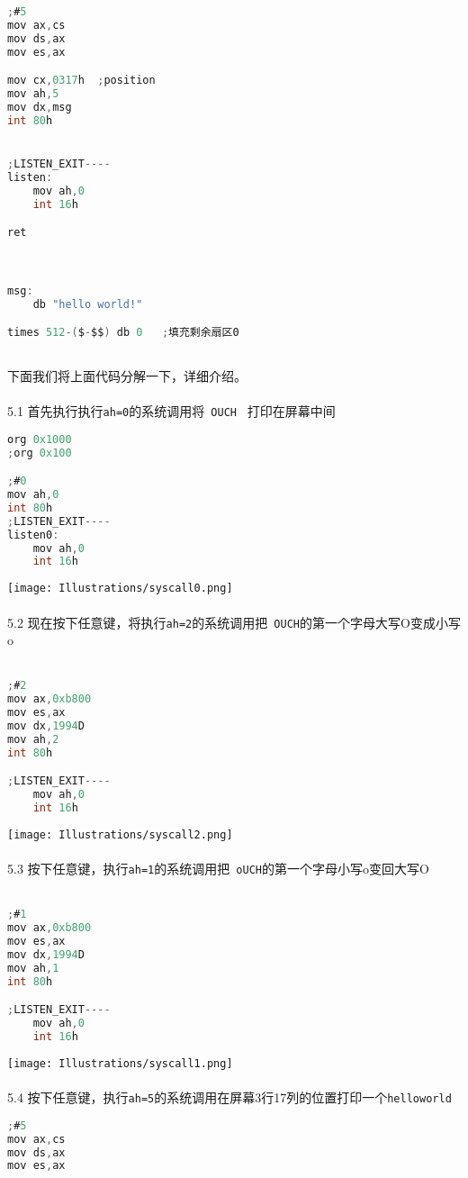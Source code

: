 \documentclass[a4paper]{article}
\begin{document}
{{{\begin{lstlisting}[language={C}]
;#5
mov ax,cs
mov ds,ax
mov es,ax

mov cx,0317h  ;position
mov ah,5
mov dx,msg
int 80h


;LISTEN_EXIT----
listen:
	mov ah,0
	int 16h

ret



msg:
	db "hello world!"

times 512-($-$$) db 0	;填充剩余扇区0



	\end{lstlisting}}
下面我们将上面代码分解一下，详细介绍。\\\\
5.1 首先执行执行\verb|ah=0|的系统调用将\verb| OUCH |  打印在屏幕中间
{\scriptsize
\begin{lstlisting}[language={C}]
org 0x1000
;org 0x100

;#0
mov ah,0
int 80h
;LISTEN_EXIT----
listen0:
	mov ah,0
	int 16h

	\end{lstlisting}}
{\center\texttt{[image: Illustrations/syscall0.png]}}\\\\
5.2 现在按下任意键，将执行\verb|ah=2|的系统调用把\verb| OUCH|的第一个字母大写O变成小写o\\\\
{\scriptsize
\begin{lstlisting}[language={C}]
;#2
mov ax,0xb800
mov es,ax
mov dx,1994D
mov ah,2
int 80h

;LISTEN_EXIT----
	mov ah,0
	int 16h

	\end{lstlisting}}
{\center\texttt{[image: Illustrations/syscall2.png]}}\\\\
5.3 按下任意键，执行\verb|ah=1|的系统调用把\verb| oUCH|的第一个字母小写o变回大写O\\\\
{\scriptsize
\begin{lstlisting}[language={C}]
;#1
mov ax,0xb800
mov es,ax
mov dx,1994D
mov ah,1
int 80h

;LISTEN_EXIT----
	mov ah,0
	int 16h


	\end{lstlisting}}
{\center\texttt{[image: Illustrations/syscall1.png]}}\\\\
5.4 按下任意键，执行\verb|ah=5|的系统调用在屏幕3行17列的位置打印一个\verb|helloworld|
{\scriptsize
\begin{lstlisting}[language={C}]
;#5
mov ax,cs
mov ds,ax
mov es,ax


\end{lstlisting}}}}
\end{document}
